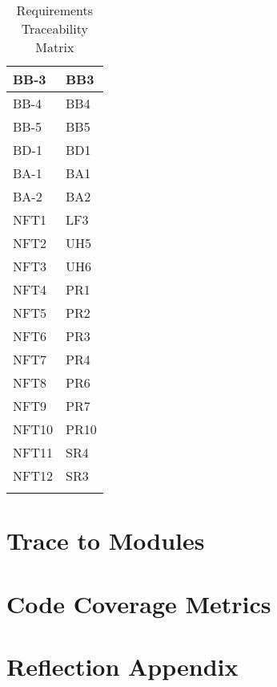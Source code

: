 \documentclass[12pt, titlepage]{article}
\begin{document}
\begin{longtable}{| p{} | p{} |}
  \hline
  BB-3 & BB3\\
  \hline
  BB-4 & BB4\\
  \hline
  BB-5 & BB5\\
  \hline
  BD-1 & BD1\\
  \hline
  BA-1 & BA1\\
  \hline
  BA-2 & BA2\\
  \hline
  NFT1 & LF3\\
  \hline
  NFT2 & UH5\\
  \hline
  NFT3 & UH6\\
  \hline
  NFT4 & PR1\\
  \hline
  NFT5 & PR2\\
  \hline
  NFT6 & PR3\\
  \hline
  NFT7 & PR4\\
  \hline
  NFT8 & PR6\\
  \hline
  NFT9 & PR7\\
  \hline
  NFT10 & PR10\\
  \hline
  NFT11 & SR4\\
  \hline
  NFT12 & SR3\\
  \hline
\caption{Requirements Traceability Matrix}
\end{longtable}
		
\section{Trace to Modules}		

\section{Code Coverage Metrics}

\appendix
\section{Reflection Appendix}





\end{document}
